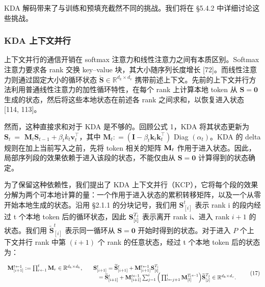 KDA 解码带来了与训练和预填充截然不同的挑战。我们将在 §5.4.2 中详细讨论这些挑战。

\subsubsection{KDA 上下文并行}\label{kda-context-parallelism}

上下文并行的通信开销在 softmax 注意力和线性注意力之间有本质区别。Softmax 注意力要求各 rank 交换 key--value 块，其大小随序列长度增长 {[}72{]}。而线性注意力则通过固定大小的循环状态 \(\breve { \mathbf { S } } \in \mathbb { R } ^ { d _ { k } \times d _ { v } }\) 携带前述上下文。先前的上下文并行方法利用普通线性注意力的加性循环特性，在每个 rank 上计算本地 token 从 \(\mathbf { S } = \mathbf { 0 }\) 生成的状态，然后将这些本地状态在前述各 rank 之间求和，以恢复进入状态 {[}114, 113{]}。

然而，这种直接求和对于 KDA 是不够的。回顾公式 1，KDA 将其状态更新为 \(\mathbf { S } _ { t } ~ =\) \(\mathbf { M } _ { t } \mathbf { S } _ { t - 1 } + \beta _ { t } k _ { t } \pmb { v } _ { t } ^ { \top }\)，其中 \(\mathbf { M } _ { t } : = \left( \mathbf { I } - \beta _ { t } \pmb { k } _ { t } \pmb { k } _ { t } ^ { \top } \right)\) Diag \(\left( \alpha _ { t } \right)\)。KDA 的 delta 规则在加上当前写入之前，先将 token 相关的矩阵 \({ { \bf { M } } _ { t } }\) 作用于进入状态。因此，局部序列段的效果依赖于进入该段的状态，不能仅由从 \(\mathbf { S } = \mathbf { 0 }\) 计算得到的状态确定。

为了保留这种依赖性，我们提出了 KDA 上下文并行（KCP），它将每个段的效果分解为两个可本地计算的量：一个作用于进入状态的累积转移矩阵，以及一个从零开始本地生成的状态。沿用 §2.1.1 的分块记号，我们用 \(\mathbf { S } _ { [ i ] } ^ { t }\) 表示 rank i 的段内经过 t 个本地 token 后的循环状态，因此 \({ \bf S } _ { [ i ] } ^ { T _ { i } }\) 表示离开 rank i、进入 rank \(i + 1\) 的状态。我们用 \(\widetilde { \mathbf { S } } _ { [ i ] } ^ { t }\) 表示同一循环从 \(\mathbf { S } = \mathbf { 0 }\) 开始时得到的状态。对于进入 \(P\) 个上下文并行 rank 中第 \(( i + 1 )\) 个 rank 的任意状态，经过 t 个本地 token 后的状态为：

\[
\begin{array}{r l} \mathbf {M} _ {[ i + 1 ]} ^ {t \leftarrow 1} := \prod_ {r \leftarrow 1} ^ {t} \mathbf {M} _ {r} \in \mathbb {R} ^ {d _ {k} \times d _ {k}}, & \quad \mathbf {S} _ {[ i + 1 ]} ^ {t} = \widetilde {\mathbf {S}} _ {[ i + 1 ]} ^ {t} + \mathbf {M} _ {[ i + 1 ]} ^ {t \leftarrow 1} \mathbf {S} _ {[ i ]} ^ {T _ {i}} \\ & \qquad = \widetilde {\mathbf {S}} _ {[ i + 1 ]} ^ {t} + \mathbf {M} _ {[ i + 1 ]} ^ {t \leftarrow 1} \sum_ {j = 1} ^ {i} \Big (\prod_ {l \leftarrow j + 1} ^ {i} \mathbf {M} _ {[ l ]} ^ {T _ {l} \leftarrow 1} \Big) \widetilde {\mathbf {S}} _ {[ j ]} ^ {T _ {j}} \in \mathbb {R} ^ {d _ {k} \times d _ {v}}. \end{array}\tag{17}
\]

